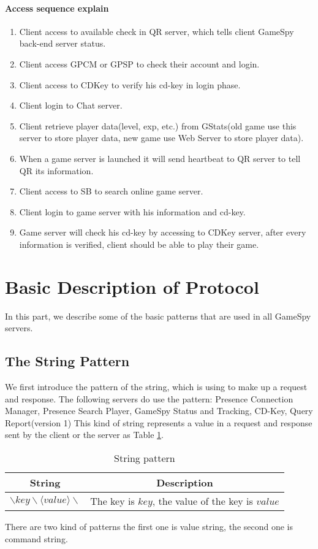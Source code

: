 \documentclass[oneside,titlepage,a4paper]{Definition/retrospy} %
\begin{document}
\paragraph{Access sequence explain}
\begin{enumerate}
	\item Client access to available check in QR server, which tells client GameSpy back-end server status.
	\item Client access GPCM or GPSP to check their account and login.
	\item Client access to CDKey to verify his cd-key in login phase.
	\item Client login to Chat server.
	\item Client retrieve player data(level, exp, etc.) from GStats(old game use this server to store player data, new game use Web Server to store player data).
	\item When a game server is launched it will send heartbeat to QR server to tell QR its information.
	\item Client access to SB to search online game server.
	\item Client login to game server with his information and cd-key.
	\item Game server will check his cd-key by accessing to CDKey server, after every information is verified, client should be able to play their game.
\end{enumerate}


\section{Basic Description of Protocol}
In this part, we describe some of the basic patterns that are used in all GameSpy servers.

\subsection{The String Pattern}
We first introduce the pattern of the string, which is using to make up a request and response.
The following servers do use the pattern: Presence Connection Manager, Presence Search Player, GameSpy Status and Tracking, CD-Key, Query Report(version 1)
This kind of string represents a value in a request and response sent by the client or the server as Table \ref{String pattern}.\\


\begin{table}[H]
	\centering
	\begin{tabular}{|c|c|}
		\hline 
		\textbf{String}&\textbf{Description}  \\ 
		\hline 
		$ \backslash key \backslash \langle value \rangle \backslash $& The key is $ key $, the value of the key is $  value  $  \\ 
 		\hline
	\end{tabular} 
	\caption{String pattern}
	\label{String pattern}
\end{table}
There are two kind of patterns the first one is value string, the second one is command string.
\end{document}
